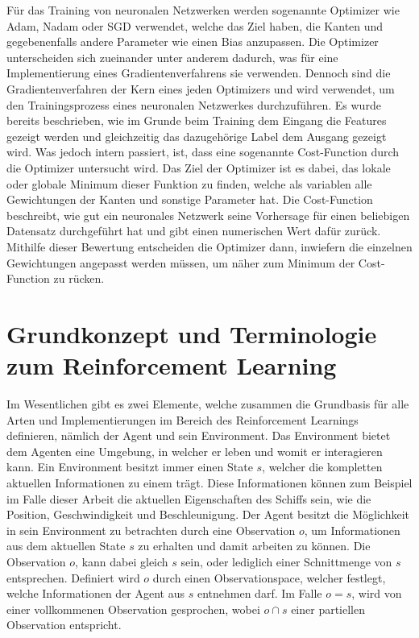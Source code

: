 \documentclass[]{iat}
\begin{document}
Für das Training von neuronalen Netzwerken werden sogenannte Optimizer wie Adam, Nadam oder SGD verwendet, welche das Ziel haben, die Kanten und gegebenenfalls andere Parameter wie einen Bias anzupassen. Die Optimizer unterscheiden sich zueinander unter anderem dadurch, was für eine Implementierung eines Gradientenverfahrens sie verwenden. Dennoch sind die Gradientenverfahren der Kern eines jeden Optimizers und wird verwendet, um den Trainingsprozess eines neuronalen Netzwerkes durchzuführen. Es wurde bereits beschrieben, wie im Grunde beim Training dem Eingang die Features gezeigt werden und gleichzeitig das dazugehörige Label dem Ausgang gezeigt wird. Was jedoch intern passiert, ist, dass eine sogenannte Cost-Function durch die Optimizer untersucht wird. Das Ziel der Optimizer ist es dabei, das lokale oder globale Minimum dieser Funktion zu finden, welche als variablen alle Gewichtungen der Kanten und sonstige Parameter hat. Die Cost-Function beschreibt, wie gut ein neuronales Netzwerk seine Vorhersage für einen beliebigen Datensatz durchgeführt hat und gibt einen numerischen Wert dafür zurück. Mithilfe dieser Bewertung entscheiden die Optimizer dann, inwiefern die einzelnen Gewichtungen angepasst werden müssen, um näher zum Minimum der Cost-Function zu rücken.

\newpage
\section{Grundkonzept und Terminologie zum Reinforcement Learning} \label{sec:grundkonzept_rf}
Im Wesentlichen gibt es zwei Elemente, welche zusammen die Grundbasis für alle Arten und Implementierungen im Bereich des Reinforcement Learnings definieren, nämlich der Agent und sein Environment. Das Environment bietet dem Agenten eine Umgebung, in welcher er leben und womit er interagieren kann. Ein Environment besitzt immer einen State $s$, welcher die kompletten aktuellen Informationen zu einem trägt. Diese Informationen können zum Beispiel im Falle dieser Arbeit die aktuellen Eigenschaften des Schiffs sein, wie die Position, Geschwindigkeit und Beschleunigung. Der Agent besitzt die Möglichkeit in sein Environment zu betrachten durch eine Observation $o$, um Informationen aus dem aktuellen State $s$ zu erhalten und damit arbeiten zu können. Die Observation $o$, kann dabei gleich $s$ sein, oder lediglich einer Schnittmenge von $s$ entsprechen. Definiert wird $o$ durch einen Observationspace, welcher festlegt, welche Informationen der Agent aus $s$ entnehmen darf. Im Falle $o=s$, wird von einer vollkommenen Observation gesprochen, wobei $o \cap s$ einer partiellen Observation entspricht.
\end{document}
